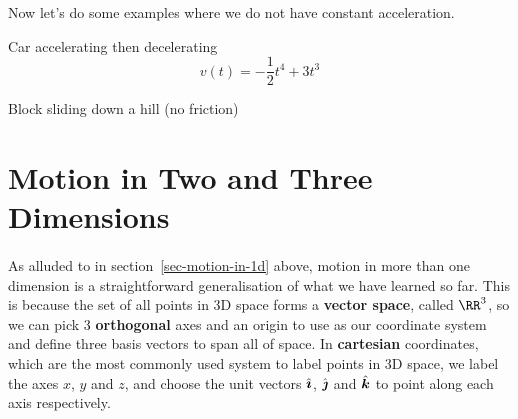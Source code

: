 \documentclass[../classical_mechanics.tex]{subfiles}
\begin{document}
        Now let's do some examples where we do not have constant acceleration.
        \begin{example}
            Car accelerating then decelerating %
            \begin{equation*}
                v(t)=-\frac{1}{2}t^4+3t^3
            \end{equation*}
        \end{example}
        \begin{example}
            Block sliding down a hill (no friction) %
        \end{example}

    \section{Motion in Two and Three Dimensions}
        \paragraph{}
        As alluded to in section~\ref{sec-motion-in-1d} above, motion in more than one dimension is a straightforward generalisation of what we have learned so far.
        This is because the set of all points in 3D space forms a \textbf{vector space}, called $\RR^3$, so we can pick 3 \textbf{orthogonal} axes and an origin to use as our coordinate system and define three basis vectors to span all of space.
        In \textbf{cartesian} coordinates, which are the most commonly used system to label points in 3D space, we label the axes $x$, $y$ and $z$, and choose the unit vectors $\hat{\boldsymbol{\imath}}$, $\hat{\boldsymbol{\jmath}}$ and $\hat{\boldsymbol{k}}$ to point along each axis respectively.
\end{document}
